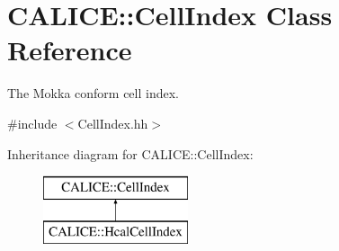 \section{C\-A\-L\-I\-C\-E\-:\-:Cell\-Index Class Reference}
\label{classCALICE_1_1CellIndex}


The Mokka conform cell index.  




{\ttfamily \#include $<$Cell\-Index.\-hh$>$}

Inheritance diagram for C\-A\-L\-I\-C\-E\-:\-:Cell\-Index\-:\begin{figure}[H]
\begin{center}
\leavevmode
\includegraphics[height=2.000000cm]{classCALICE_1_1CellIndex}
\end{center}
\end{figure}
